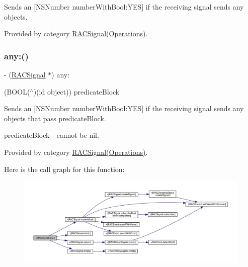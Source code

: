 Sends an \mbox{[}N\+S\+Number number\+With\+Bool\+:Y\+ES\mbox{]} if the receiving signal sends any objects. 

Provided by category \mbox{\hyperlink{category_r_a_c_signal_07_operations_08_af64359cf92ab95039f48270a71446e08}{R\+A\+C\+Signal(\+Operations)}}.

\mbox{\label{interface_r_a_c_signal_a4bfb6af6556526457fbf0e5d3c878536}} 
\subsubsection{\texorpdfstring{any\+:()}{any:()}\hspace{0.1cm}{\footnotesize\ttfamily [1/3]}}
{\footnotesize\ttfamily -\/ (\mbox{\hyperlink{interface_r_a_c_signal}{R\+A\+C\+Signal}} $\ast$) any\+: \begin{DoxyParamCaption}\item[{(B\+O\+OL($^\wedge$)(id object))}]{predicate\+Block }\end{DoxyParamCaption}}

Sends an \mbox{[}N\+S\+Number number\+With\+Bool\+:Y\+ES\mbox{]} if the receiving signal sends any objects that pass {\ttfamily predicate\+Block}.

predicate\+Block -\/ cannot be nil. 

Provided by category \mbox{\hyperlink{category_r_a_c_signal_07_operations_08_a4bfb6af6556526457fbf0e5d3c878536}{R\+A\+C\+Signal(\+Operations)}}.

Here is the call graph for this function\+:\nopagebreak
\begin{figure}[H]
\begin{center}
\leavevmode
\includegraphics[width=350pt]{interface_r_a_c_signal_a4bfb6af6556526457fbf0e5d3c878536_cgraph}
\end{center}
\end{figure}
\mbox{\label{interface_r_a_c_signal_a4bfb6af6556526457fbf0e5d3c878536}} 
